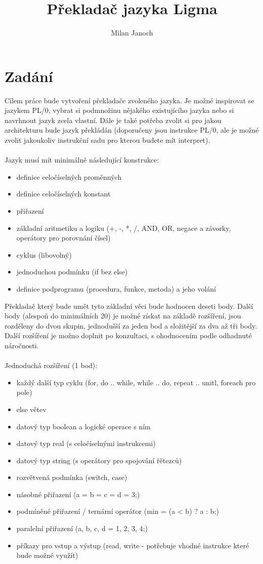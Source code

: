 \documentclass[czech, oth, kiv, he, iso690numb, viewonly]{fasthesis}
\title{Překladač jazyka Ligma}
\author{Milan Janoch}{a Jakub Pavlíček}{Bc.}{}
\begin{document}
\frontpages[tm]
\tableofcontents


\chapter{Zadání}
Cílem práce bude vytvoření překladače zvoleného jazyka. Je možné inspirovat se jazykem PL/0, vybrat si podmnožinu nějakého existujícího jazyka nebo si navrhnout jazyk zcela vlastní. Dále je také potřeba zvolit si pro jakou architekturu bude jazyk překládán (doporučeny jsou instrukce PL/0, ale je možné zvolit jakoukoliv instrukční sadu pro kterou budete mít interpret).
\\\\Jazyk musí mít minimálně následující konstrukce:
\begin{itemize}
    \item definice celočíselných proměnných
    \item definice celočíselných konstant
    \item přiřazení
    \item základní aritmetiku a logiku (+, -, *, /, AND, OR, negace a závorky, operátory pro porovnání čísel)
    \item cyklus (libovolný)
    \item jednoduchou podmínku (if bez else)
    \item definice podprogramu (procedura, funkce, metoda) a jeho volání
\end{itemize}
Překladač který bude umět tyto základní věci bude hodnocen deseti body. Další body (alespoň do minimálních 20) je možné získat na základě rozšíření, jsou rozděleny do dvou skupin, jednodušší za jeden bod a složitější za dva až tři body. Další rozšíření je možno doplnit po konzultaci, s ohodnocením podle odhadnuté náročnosti.
\\\\Jednoduchá rozšíření (1 bod):
\begin{itemize}
    \item každý další typ cyklu (for, do .. while, while .. do, repeat .. unitl, foreach pro pole)
    \item else větev
    \item datový typ boolean a logické operace s ním
    \item datový typ real (s celočíselnými instrukcemi)
    \item datový typ string (s operátory pro spojování řětezců)
    \item rozvětvená podmínka (switch, case)
    \item násobné přiřazení (a = b = c = d = 3;)
    \item podmíněné přiřazení / ternární operátor (min = (a < b) ? a : b;)
    \item paralelní přiřazení ({a, b, c, d} = {1, 2, 3, 4};)
    \item příkazy pro vstup a výstup (read, write - potřebuje vhodné instrukce které bude možné využít)
\end{itemize}
\end{document}
